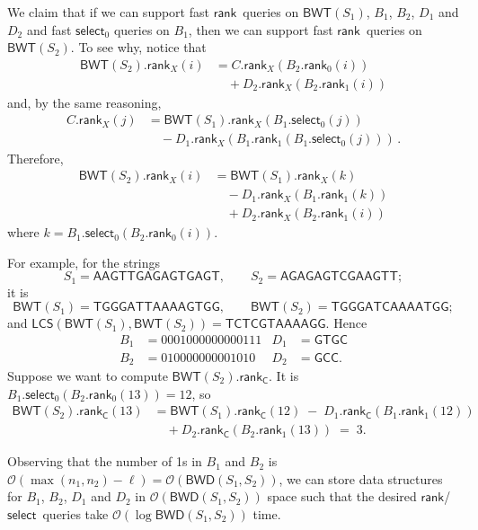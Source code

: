 \documentclass{llncs}
\newcommand{\Oh}[1]
  {\ensuremath{\mathcal{O}\!\left( {#1} \right)}}
\newcommand{\LCS}
  {\ensuremath{\mathsf{LCS}}}
\newcommand{\BWD}
  {\ensuremath{\mathsf{BWD}}}
\newcommand{\BWT}
  {\ensuremath{\mathsf{BWT}}}
\newcommand{\rank}
  {\ensuremath{\mathsf{rank}}}
\newcommand{\select}
  {\ensuremath{\mathsf{select}}}
\begin{document}
We claim that if we can support fast \rank\ queries on \(\BWT (S_1)\), $B_1$,
$B_2$, $D_1$ and $D_2$ and fast $\select_0$ queries on $B_1$, then we can
support fast \rank\ queries on \(\BWT (S_2)\). To see why, notice that
\begin{align*}
\BWT (S_2).\rank_X (i)
& = C.\rank_X (B_2.\rank_0 (i))\\
& \quad + D_2.\rank_X (B_2.\rank_1 (i))
\end{align*}
and, by the same reasoning,
\begin{align*}
C.\rank_X (j)
& = \BWT (S_1).\rank_X (B_1.\select_0 (j))\\
& \quad - D_1.\rank_X (B_1.\rank_1 (B_1.\select_0 (j)))\,.
\end{align*}
Therefore,
\begin{align*}
\BWT (S_2).\rank_X (i)
& = \BWT (S_1).\rank_X (k)\\
& \quad - D_1.\rank_X (B_1.\rank_1 (k))\\
& \quad + D_2.\rank_X (B_2.\rank_1 (i))
\end{align*}
where \(k = B_1.\select_0 (B_2.\rank_0 (i))\).


For example, for the strings
$$
S_1 = \mathsf{AAGTTGAGAGTGAGT},\qquad
S_2 = \mathsf{AGAGAGTCGAAGTT};
$$
it is
$$
\BWT (S_1) = \mathsf{TGGGATTAAAAGTGG},\qquad
\BWT (S_2) = \mathsf{TGGGATCAAAATGG};
$$
and $\LCS(\BWT (S_1),\BWT (S_2)) = \mathsf{TCTCGTAAAAGG}$. Hence
\begin{align*}
B_1  & = 0001000000000111  & D_1  &= \mathsf{GTGC}\\
B_2  & = 010000000001010   & D_2  & = \mathsf{GCC}.
\end{align*}
Suppose we want to compute $\BWT (S_2).\rank_\mathsf{C}$. It is
\(B_1.\select_0 (B_2.\rank_0 (13)) = 12\), so
\begin{align*}
\BWT (S_2).\rank_\mathsf{C} (13)
& = \BWT (S_1).\rank_\mathsf{C} (12)\; -\; D_1.\rank_\mathsf{C} (B_1.\rank_1 (12))
\\
& \quad + D_2.\rank_\mathsf{C} (B_2.\rank_1 (13)) \;=\; 3.
\end{align*}


Observing that the number of 1s in $B_1$ and $B_2$ is \(\Oh{\max (n_1, n_2) -
\ell} = \Oh{\BWD (S_1, S_2)}\), we can store data structures for $B_1$,
$B_2$, $D_1$ and $D_2$ in $\Oh{\BWD (S_1, S_2)}$ space such that the desired
\rank/\select\ queries take $\Oh{\log \BWD (S_1, S_2)}$ time.
\end{document}

